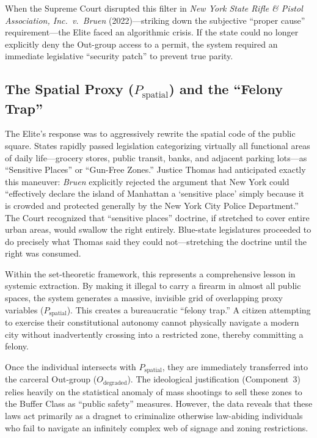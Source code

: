 \documentclass[12pt,openany]{book}
\begin{document}
When the Supreme Court disrupted this filter in \textit{New York State Rifle \& Pistol Association, Inc.\ v.\ Bruen} (2022)---striking down the subjective ``proper cause'' requirement---the Elite faced an algorithmic crisis. If the state could no longer explicitly deny the Out-group access to a permit, the system required an immediate legislative ``security patch'' to prevent true parity.

\subsection{The Spatial Proxy (\texorpdfstring{$P_{\text{spatial}}$}{P\_spatial}) and the ``Felony Trap''}
The Elite's response was to aggressively rewrite the spatial code of the public square. States rapidly passed legislation categorizing virtually all functional areas of daily life---grocery stores, public transit, banks, and adjacent parking lots---as ``Sensitive Places'' or ``Gun-Free Zones.'' Justice Thomas had anticipated exactly this maneuver: \textit{Bruen} explicitly rejected the argument that New York could ``effectively declare the island of Manhattan a `sensitive place' simply because it is crowded and protected generally by the New York City Police Department.'' The Court recognized that ``sensitive places'' doctrine, if stretched to cover entire urban areas, would swallow the right entirely. Blue-state legislatures proceeded to do precisely what Thomas said they could not---stretching the doctrine until the right was consumed.

Within the set-theoretic framework, this represents a comprehensive lesson in systemic extraction.
 By making it illegal to carry a firearm in almost all public spaces, the system generates a massive, invisible grid of overlapping proxy variables ($P_{\text{spatial}}$). This creates a bureaucratic ``felony trap.'' A citizen attempting to exercise their constitutional autonomy cannot physically navigate a modern city without inadvertently crossing into a restricted zone, thereby committing a felony.

Once the individual intersects with $P_{\text{spatial}}$, they are immediately transferred into the carceral Out-group ($O_{\text{degraded}}$). The ideological justification (Component~3) relies heavily on the statistical anomaly of mass shootings to sell these zones to the Buffer Class as ``public safety'' measures. However, the data reveals that these laws act primarily as a dragnet to criminalize otherwise law-abiding individuals who fail to navigate an infinitely complex web of signage and zoning restrictions.
\end{document}
